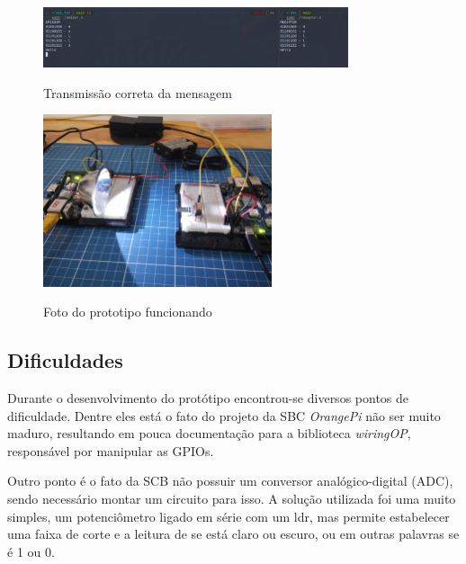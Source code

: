 \begin{figure}[!htbp]
  \caption{Transmissão correta da mensagem}
  \includegraphics[width=0.8\textwidth]{images/vlc_run.png}
  \label{vlc_funcionando}
\end{figure}

\begin{figure}[!htbp]
  \caption{Foto do prototipo funcionando}
  \includegraphics[width=0.6\textwidth]{images/vlc_funcionamento.jpg}
  \label{vlc_funcionando_foto}
\end{figure}


\subsection{Dificuldades}

Durante o desenvolvimento do protótipo encontrou-se diversos pontos de dificuldade. Dentre eles está o fato do projeto da SBC \textit{OrangePi} não ser muito maduro, resultando em pouca documentação para a biblioteca \textit{wiringOP}, responsável por manipular as GPIOs.

Outro ponto é o fato da SCB não possuir um conversor analógico-digital (ADC), sendo necessário montar um circuito para isso. A solução utilizada foi uma muito simples, um potenciômetro ligado em série com um ldr, mas permite estabelecer uma faixa de corte e a leitura de se está claro ou escuro, ou em outras palavras se é 1 ou 0.

